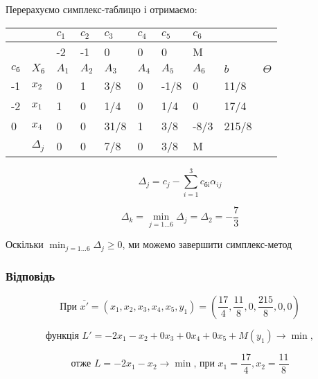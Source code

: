 \documentclass[a4paper, 12pt]{article}
\begin{document}
Перерахуємо симплекс-таблицю і отримаємо:

\begin{table}[H]
    \centering
    \begin{tabular}{|l|l|l|l|l|l|l|l|l|l|}
    \hline
         &  & $c_1$ & $c_2$ & $c_3$ & $c_4$ & $c_5$ & $c_6$ & & \\ \hline
         &  & -2 & -1 & 0 & 0 & 0 & M &  &  \\ \hline
         $c_\text{б}$ & $X_\text{б}$ & $A_1$ & $A_2$ & $A_3$ & $A_4$ & $A_5$ & $A_6$ & $b$  & $\Theta$ \\ \hline
        -1 & $x_2$ & 0 & 1 & 3/8 & 0 & -1/8 & 0 & 11/8 & \\ \hline
        -2 & $x_1$ & 1 & 0 & 1/4 & 0 & 1/4 & 0 & 17/4	 & \\ \hline
        0 & $x_4$ & 0 & 0 & 31/8 & 1 & 3/8 & -8/3 & 215/8 & \\ \hline
         & $\Delta_j$ & 0 & 0 & 7/8 & 0 & 3/8 & M &  &  \\ \hline
    \end{tabular}
\end{table}

\begin{equation*}
	\Delta_j = c_j - \sum_{i=1}^{3} c_\text{бi} \alpha_{ij}  
\end{equation*}

\begin{equation*}
	\Delta_k = \min_{j=1 \dots 6} \Delta_j = \Delta_2 = -\frac{7}{3}
\end{equation*}

Оскільки $\min_{j=1 \dots 6} \Delta_j \geqslant 0$, ми можемо завершити симплекс-метод

\subsubsection{Відповідь}



\begin{equation*}
\text{При }\overline{x'} = \left(x_1, x_2, x_3, x_4, x_5, y_1\right) = \left(\frac{17}{4},\frac{11}{8}, 0, \frac{215}{8}, 0, 0\right)
\end{equation*}

\begin{equation*}
\text{функція }L' = -2x_1 - x_2 + 0x_3 + 0x_4 + 0x_5 + M(y_1) \rightarrow \min,
\end{equation*}

\begin{equation*}
\text{отже }L = -2x_1 - x_2 \rightarrow \min \text{, при } x_1 = \frac{17}{4}, x_2 = \frac{11}{8}
\end{equation*}
\end{document}
